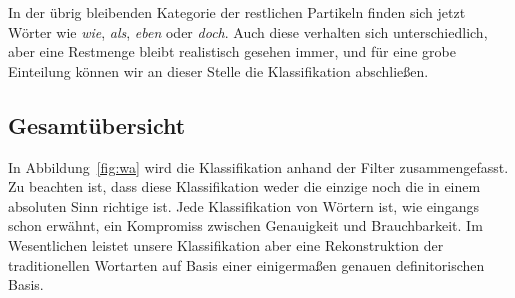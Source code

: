 \begin{exe}
  \ex\label{ex:wa7392} 
  \begin{xlist}
  \end{xlist}
\end{exe}

In der übrig bleibenden Kategorie der restlichen Partikeln finden sich jetzt Wörter wie \textit{wie}, \textit{als}, \textit{eben} oder \textit{doch}.
Auch diese verhalten sich unterschiedlich, aber eine Restmenge bleibt realistisch gesehen immer, und für eine grobe Einteilung können wir an dieser Stelle die Klassifikation abschließen.


\subsection{Gesamtübersicht}

\label{sec:gesamtuebersichtwortklassen}

In Abbildung~\ref{fig:wa} wird die Klassifikation anhand der Filter zusammengefasst.
Zu beachten ist, dass diese Klassifikation weder die einzige noch die in einem absoluten Sinn richtige ist.
Jede Klassifikation von Wörtern ist, wie eingangs schon erwähnt, ein Kompromiss zwischen Genauigkeit und Brauchbarkeit.
Im Wesentlichen leistet unsere Klassifikation aber eine Rekonstruktion der traditionellen Wortarten auf Basis einer einigermaßen genauen definitorischen Basis.

\newcommand{\Bjn}{\B{dl}_{\textnormal{Ja}}\B{dr}^{\textnormal{Nein}}}
\newcommand{\Bjnd}{\B{dll}_{\textnormal{Ja}}\B{drr}^{\textnormal{Nein}}}

